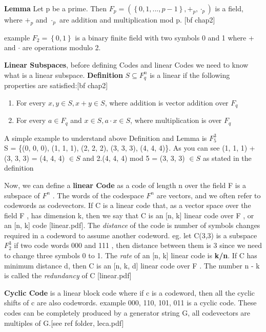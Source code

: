 \textbf{Lemma} Let p be a prime. Then $F_p = (\left\{0, 1, . . . , p - 1\right\}, +_p , \cdot_p )$ is a field, where $+_p$ and $\cdot_p$ are
addition and multiplication mod p. [bf chap2]

example $F_2 = \left\{0,1\right\}$ is a binary finite field with two symbols 0 and 1 where + and $\cdot$ are operations modulo 2.

\textbf{Linear Subspaces},  before defining Codes and linear Codes we need to know what is a linear subspace.
\textbf{Definition} $ S \subseteq F_q^n $ is a linear if the following properties are satisfied:[bf chap2]
\begin{enumerate}
	\item For every $x,y \in S, x+y \in S$, where addition is vector addition over $F_q$
	\item For every $a \in F_q$ and $x \in S, a\cdot x\in S$, where multiplication is over $F_q$
\end{enumerate}

A simple example to understand above Definition and Lemma is $F_5^3$\\
S = \{(0, 0, 0), (1, 1, 1), (2, 2, 2), (3, 3, 3), (4, 4, 4)\}.
As you can see (1, 1, 1) + (3, 3, 3) = (4, 4, 4) $\in S$ and 2.(4, 4, 4) mod 5 = (3, 3, 3) $\in S$ as stated in the definition

Now, we can define a \textbf{linear Code} as a code of length n over the field F is a subspace of $F^n$ . The words of the codespace $F^n$ are vectors, and we often refer to codewords as codevectors.
If C is a linear code that, as a vector space over the field F , has dimension k,
then we say that C is an [n, k] linear code over F , or an [n, k] code [linear.pdf]. The \emph{distance} of the code is number of symbols changes required in a codeword to assume another codeword. eg. let C(3,3) is a subspace $F_2^3$ if two code words 000 and 111 , then distance between them is 3 since we need to change three symbols 0 to 1.
The \emph{rate} of an [n, k] linear code is \textbf{k/n}. If C has minimum distance d, then C is an [n, k, d] linear code over F .
The number n - k is called the \emph{redundancy} of C [linear.pdf]

\textbf{Cyclic Code} is a linear block code where if c is a codeword, then all the cyclic shifts of c are also codewords.
example {000, 110, 101, 011} is a cyclic code.
These codes can be completely produced by a generator string G, all codevectors are multiples of G.[see ref folder, leca.pdf]\\

